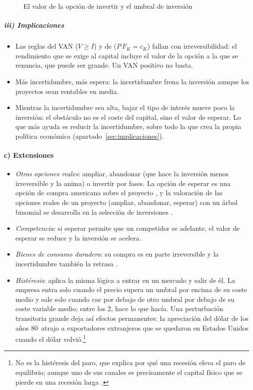 \documentclass[11pt]{article}
\begin{document}
\begin{figure}[H]
\centering
\caption{El valor de la opción de invertir y el umbral de inversión}\label{fig:opcion-esperar}
\end{figure}

\subparagraph{iii) Implicaciones}

\begin{itemize}
\item Las reglas del VAN ($V\geq I$) y de  ($P\,F_K=c_K$) fallan con irreversibilidad: el rendimiento que se exige al capital incluye el valor de la opción a la que se renuncia, que puede ser grande\nocite{Pindyck1991Irreversibility}. Un VAN positivo no basta.
\item Más incertidumbre, más espera: la incertidumbre frena la inversión aunque los proyectos sean rentables en media.
\item Mientras la incertidumbre sea alta, bajar el tipo de interés mueve poco la inversión: el obstáculo no es el coste del capital, sino el valor de esperar. Lo que más ayuda es reducir la incertidumbre, sobre todo la que crea la propia política económica (apartado~\ref{sec:implicaciones}).
\end{itemize}

\paragraph{c) Extensiones}

\begin{itemize}
\item \emph{Otras opciones reales}: ampliar, abandonar (que hace la inversión menos irreversible y la anima) o invertir por fases. La opción de esperar es una opción de compra americana sobre el proyecto , y la valoración de las opciones reales de un proyecto (ampliar, abandonar, esperar) con un árbol binomial se desarrolla en la selección de inversiones .
\item \emph{Competencia}: si esperar permite que un competidor se adelante, el valor de esperar se reduce y la inversión se acelera.
\item \emph{Bienes de consumo duradero}: su compra es en parte irreversible y la incertidumbre también la retrasa .
\item \emph{Histéresis}: \textcite{Dixit1989Entry} aplica la misma lógica a entrar en un mercado y salir de él. La empresa entra solo cuando el precio supera un umbral por encima de su coste medio y sale solo cuando cae por debajo de otro umbral por debajo de su coste variable medio; entre los 2, hace lo que hacía. Una perturbación transitoria grande deja así efectos permanentes: la apreciación del dólar de los años 80~atrajo a exportadores extranjeros que se quedaron en Estados Unidos cuando el dólar volvió\nocite{BaldwinKrugman1989Persistent}.\footnote{No es la histéresis del paro, que explica por qué una recesión eleva el paro de equilibrio; aunque uno de sus canales es precisamente el capital físico que se pierde en una recesión larga .}
\end{itemize}
\end{document}

